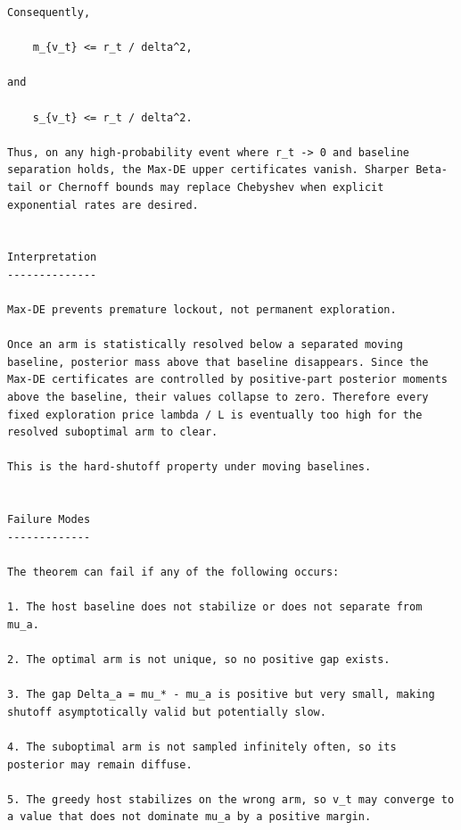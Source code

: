 \begin{small}
\begin{verbatim}
Consequently,

    m_{v_t} <= r_t / delta^2,

and

    s_{v_t} <= r_t / delta^2.

Thus, on any high-probability event where r_t -> 0 and baseline separation holds, the Max-DE upper certificates vanish. Sharper Beta-tail or Chernoff bounds may replace Chebyshev when explicit exponential rates are desired.


Interpretation
--------------

Max-DE prevents premature lockout, not permanent exploration.

Once an arm is statistically resolved below a separated moving baseline, posterior mass above that baseline disappears. Since the Max-DE certificates are controlled by positive-part posterior moments above the baseline, their values collapse to zero. Therefore every fixed exploration price lambda / L is eventually too high for the resolved suboptimal arm to clear.

This is the hard-shutoff property under moving baselines.


Failure Modes
-------------

The theorem can fail if any of the following occurs:

1. The host baseline does not stabilize or does not separate from mu_a.

2. The optimal arm is not unique, so no positive gap exists.

3. The gap Delta_a = mu_* - mu_a is positive but very small, making shutoff asymptotically valid but potentially slow.

4. The suboptimal arm is not sampled infinitely often, so its posterior may remain diffuse.

5. The greedy host stabilizes on the wrong arm, so v_t may converge to a value that does not dominate mu_a by a positive margin.
\end{verbatim}
\end{small}
